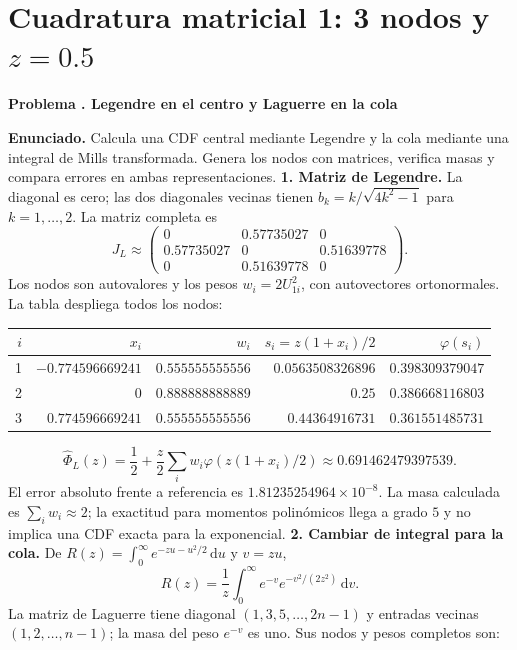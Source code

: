 \documentclass[11pt,a4paper]{article}
\newcommand{\dd}{\,\mathrm d}
\theoremstyle{definition}
\newcounter{problema}
\newenvironment{resuelto}[1]{\refstepcounter{problema}\par\medskip\Needspace{6\baselineskip}\textbf{Problema \theproblema. #1}\par}{\par\medskip}
\begin{document}
\section{\texorpdfstring{Cuadratura matricial 1: 3 nodos y $z=0.5$}{Cuadratura matricial 1: 3 nodos y z=0.5}}
\begin{resuelto}{Legendre en el centro y Laguerre en la cola}
\textbf{Enunciado.} Calcula una CDF central mediante Legendre y la cola mediante una integral de Mills transformada. Genera los nodos con matrices, verifica masas y compara errores en ambas representaciones.
\textbf{1. Matriz de Legendre.} La diagonal es cero; las dos diagonales vecinas tienen $b_k=k/\sqrt{4k^2-1}$ para $k=1,\ldots,2$. La matriz completa es
\[
J_L\approx\begin{pmatrix}0&0.57735027&0\\0.57735027&0&0.51639778\\0&0.51639778&0\end{pmatrix}.
\]
Los nodos son autovalores y los pesos $w_i=2U_{1i}^2$, con autovectores ortonormales. La tabla despliega todos los nodos:

\begin{center}\small\begin{tabular}{rrrrr}
\toprule
$i$&$x_i$&$w_i$&$s_i=z(1+x_i)/2$&$\varphi(s_i)$\\
\midrule
1&$-0.774596669241$&$0.555555555556$&$0.0563508326896$&$0.398309379047$\\
2&$0$&$0.888888888889$&$0.25$&$0.386668116803$\\
3&$0.774596669241$&$0.555555555556$&$0.44364916731$&$0.361551485731$\\
\bottomrule\end{tabular}\end{center}
\[
\widehat\Phi_L(z)=\frac12+\frac z2\sum_iw_i\varphi(z(1+x_i)/2)\approx0.691462479397539.
\]
El error absoluto frente a referencia es $1.81235254964\times10^{-8}$. La masa calculada es $\sum_iw_i\approx2$; la exactitud para momentos polinómicos llega a grado $5$ y no implica una CDF exacta para la exponencial.
\textbf{2. Cambiar de integral para la cola.} De $R(z)=\int_0^\infty e^{-zu-u^2/2}\dd u$ y $v=zu$,
\[
R(z)=\frac1z\int_0^\infty e^{-v}e^{-v^2/(2z^2)}\dd v.
\]
La matriz de Laguerre tiene diagonal $(1,3,5,\ldots,2n-1)$ y entradas vecinas $(1,2,\ldots,n-1)$; la masa del peso $e^{-v}$ es uno. Sus nodos y pesos completos son:


\end{resuelto}
\end{document}
